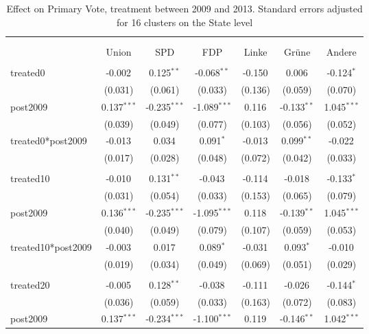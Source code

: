 \documentclass[12pt]{article}
\begin{document}
 
\begin{table}[!htbp] \centering
  \caption{Effect on Primary Vote, treatment between 2009 and 2013. Standard errors adjusted for 16 clusters on the State level}
\begin{tabular}{@{\extracolsep{5pt}}lcccccc}
\\[-1.8ex]\hline
\hline \\[-1.8ex]
\\[-1.8ex] & \multicolumn{1}{c}{Union} & \multicolumn{1}{c}{SPD} & \multicolumn{1}{c}{FDP} & \multicolumn{1}{c}{Linke} & \multicolumn{1}{c}{Grüne} & \multicolumn{1}{c}{Andere}  \\
\hline \\[-1.8ex]
 treated0 & -0.002$^{}$ & 0.125$^{**}$ & -0.068$^{**}$ & -0.150$^{}$ & 0.006$^{}$ & -0.124$^{*}$ \\
  & (0.031) & (0.061) & (0.033) & (0.136) & (0.059) & (0.070) \\
 post2009 & 0.137$^{***}$ & -0.235$^{***}$ & -1.089$^{***}$ & 0.116$^{}$ & -0.133$^{**}$ & 1.045$^{***}$ \\
  & (0.039) & (0.049) & (0.077) & (0.103) & (0.056) & (0.052) \\
 treated0*post2009 & -0.013$^{}$ & 0.034$^{}$ & 0.091$^{*}$ & -0.013$^{}$ & 0.099$^{**}$ & -0.022$^{}$ \\
  & (0.017) & (0.028) & (0.048) & (0.072) & (0.042) & (0.033) \\
\hline \\[-1.8ex]
 treated10 & -0.010$^{}$ & 0.131$^{**}$ & -0.043$^{}$ & -0.114$^{}$ & -0.018$^{}$ & -0.133$^{*}$ \\
  & (0.031) & (0.054) & (0.033) & (0.153) & (0.065) & (0.079) \\
 post2009 & 0.136$^{***}$ & -0.235$^{***}$ & -1.095$^{***}$ & 0.118$^{}$ & -0.139$^{**}$ & 1.045$^{***}$ \\
  & (0.040) & (0.049) & (0.079) & (0.107) & (0.059) & (0.053) \\
 treated10*post2009 & -0.003$^{}$ & 0.017$^{}$ & 0.089$^{*}$ & -0.031$^{}$ & 0.093$^{*}$ & -0.010$^{}$ \\
  & (0.019) & (0.034) & (0.049) & (0.069) & (0.051) & (0.029) \\
\hline \\[-1.8ex]
 treated20 & -0.005$^{}$ & 0.128$^{**}$ & -0.038$^{}$ & -0.111$^{}$ & -0.026$^{}$ & -0.144$^{*}$ \\
  & (0.036) & (0.059) & (0.033) & (0.163) & (0.072) & (0.083) \\
 post2009 & 0.137$^{***}$ & -0.234$^{***}$ & -1.100$^{***}$ & 0.119$^{}$ & -0.146$^{**}$ & 1.042$^{***}$ \\

\end{tabular}
\end{table}
\end{document}
